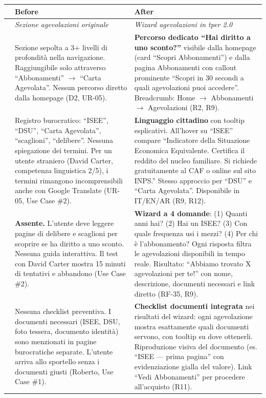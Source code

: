 \begin{table}[H]
\centering
\small
\renewcommand{\arraystretch}{1.4}
\begin{tabular}{|p{0.5cm}|p{7cm}|p{7cm}|}
\hline
& \textbf{Before} & \textbf{After} \\ \hline
\cellcolor{primaryColor!15} &
\textit{Sezione agevolazioni originale} &
\textit{Wizard agevolazioni in tper 2.0} \\ \hline

\raisebox{0.5cm}{\rotatebox{90}{\textbf{Accesso}}} &
Sezione sepolta a 3+ livelli di profondità nella navigazione. Raggiungibile solo attraverso ``Abbonamenti'' $\rightarrow$ ``Carta Agevolata''. Nessun percorso diretto dalla homepage (D2, UR-05). &
\textbf{Percorso dedicato ``Hai diritto a uno sconto?''} visibile dalla homepage (card ``Scopri Abbonamenti'') e dalla pagina Abbonamenti con callout prominente ``Scopri in 30 secondi a quali agevolazioni puoi accedere''. Breadcrumb: Home $\rightarrow$ Abbonamenti $\rightarrow$ Agevolazioni (R2, R9). \\ \hline

\raisebox{0.5cm}{\rotatebox{90}{\textbf{Linguaggio}}} &
Registro burocratico: ``ISEE'', ``DSU'', ``Carta Agevolata'', ``scaglioni'', ``delibere''. Nessuna spiegazione dei termini. Per un utente straniero (David Carter, competenza linguistica 2/5), i termini rimangono incomprensibili anche con Google Translate (UR-05, Use Case \#2). &
\textbf{Linguaggio cittadino} con tooltip esplicativi. All'hover su ``ISEE'' compare ``Indicatore della Situazione Economica Equivalente. Certifica il reddito del nucleo familiare. Si richiede gratuitamente al CAF o online sul sito INPS.'' Stesso approccio per ``DSU'' e ``Carta Agevolata''. Disponibile in IT/EN/AR (R9, R12). \\ \hline

\raisebox{0.5cm}{\rotatebox{90}{\textbf{Wizard}}} &
\textbf{Assente.} L'utente deve leggere pagine di delibere e scaglioni per scoprire se ha diritto a uno sconto. Nessuna guida interattiva. Il test con David Carter mostra 15 minuti di tentativi e abbandono (Use Case \#2). &
\textbf{Wizard a 4 domande}: (1) Quanti anni hai? (2) Hai un ISEE? (3) Con quale frequenza usi i mezzi? (4) Per chi è l'abbonamento? Ogni risposta filtra le agevolazioni disponibili in tempo reale. Risultato: ``Abbiamo trovato X agevolazioni per te!'' con nome, descrizione, documenti necessari e link diretto (RF-35, R9). \\ \hline

\raisebox{0.5cm}{\rotatebox{90}{\textbf{Documenti}}} &
Nessuna checklist preventiva. I documenti necessari (ISEE, DSU, foto tessera, documento identità) sono menzionati in pagine burocratiche separate. L'utente arriva allo sportello senza i documenti giusti (Roberto, Use Case \#1). &
\textbf{Checklist documenti integrata} nei risultati del wizard: ogni agevolazione mostra esattamente quali documenti servono, con tooltip su dove ottenerli. Riproduzione visiva del documento (es. ``ISEE --- prima pagina'' con evidenziazione gialla del valore). Link ``Vedi Abbonamenti'' per procedere all'acquisto (R11). \\ \hline


\end{tabular}
\end{table}
